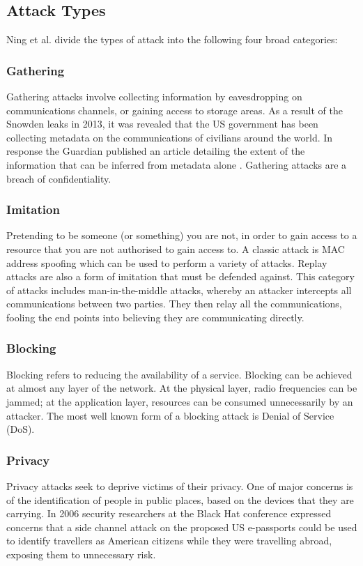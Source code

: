 \documentclass[10pt,journal,compsoc]{IEEEtran}
\begin{document}
\subsection{Attack Types}
Ning et al. \cite{Ning2013} divide the types of attack into the following
four broad categories:

\subsubsection{Gathering}
Gathering attacks involve collecting information by eavesdropping on
communications channels, or gaining access to storage areas. As a result of the
Snowden leaks in 2013, it was revealed that the US government has been
collecting metadata on the communications of civilians around the world. In
response the Guardian published an article detailing the extent of the
information that can be inferred from metadata alone \cite{Guardian2013}.
Gathering attacks are a breach of confidentiality. 

\subsubsection{Imitation}
Pretending to be someone (or something) you are not, in order to gain access to
a resource that you are not authorised to gain access to. A classic attack is
MAC address spoofing which can be used to perform a variety of attacks. Replay
attacks are also a form of imitation that must be defended against. This
category of attacks includes man-in-the-middle attacks, whereby an attacker
intercepts all communications between two parties. They then relay all the
communications, fooling the end points into believing they are communicating
directly. 

\subsubsection{Blocking}
Blocking refers to reducing the availability of a service. Blocking can be
achieved at almost any layer of the network. At the physical layer, radio
frequencies can be jammed; at the application layer, resources can be consumed
unnecessarily by an attacker. The most well known form of a blocking attack is
Denial of Service (DoS). 

\subsubsection{Privacy}
Privacy attacks seek to deprive victims of their privacy. One of major concerns
is of the identification of people in public places, based on the devices that
they are carrying. In 2006 security researchers at the Black Hat conference
\cite{Flexilis2006} expressed concerns that a side channel attack on the
proposed US e-passports could be used to identify travellers as American
citizens while they were travelling abroad, exposing them to unnecessary risk.
\end{document}
